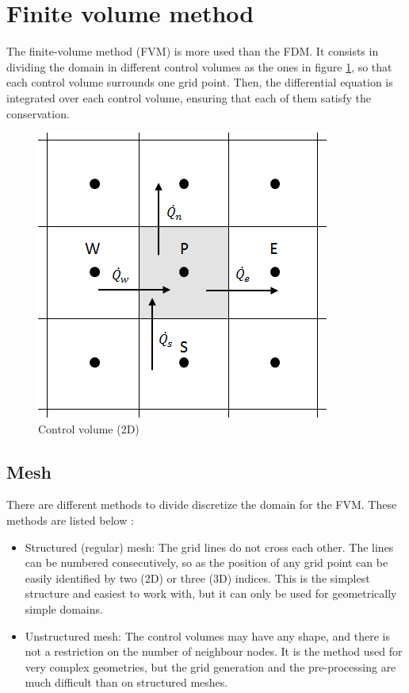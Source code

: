 \section{Finite volume method}
The finite-volume method (FVM) is more used than the FDM. It consists in dividing the domain in different control volumes as the ones in figure \ref{controlvolume2d}, so that each control volume surrounds one grid point. Then, the differential equation is integrated over each control volume, ensuring that each of them satisfy the conservation.
\begin{figure}[h!]
	\centering
	\includegraphics[scale=0.5]{StateArt/controlvolume2d}
	\caption{Control volume (2D)}
	\label{controlvolume2d}
\end{figure}

\subsection{Mesh}
There are different methods to divide discretize the domain for the FVM. These methods are listed below \cite{Ferziger2002}:
\begin{itemize}
	\item Structured (regular) mesh: The grid lines do not cross each other. The lines can be numbered consecutively, so as the position of any grid point can be easily identified by two (2D) or three (3D) indices. This is the simplest structure and easiest to work with, but it can only be used for geometrically simple domains.
	\item Unstructured mesh: The control volumes may have any shape, and there is not a restriction on the number of neighbour nodes. It is the method used for very complex geometries, but the grid generation and the pre-processing are much difficult than on structured meshes.
\end{itemize}

